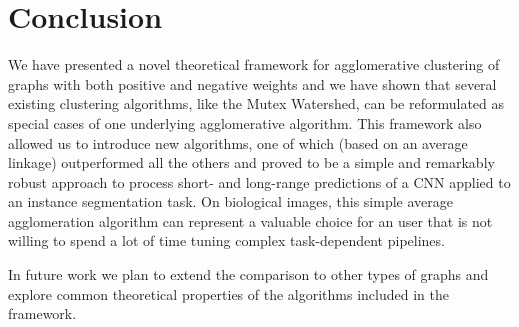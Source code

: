 \section{Conclusion}
We have presented a novel theoretical framework for agglomerative clustering of graphs with both positive and negative weights and we have shown that several existing clustering algorithms, like the Mutex Watershed, can be reformulated as special cases of one underlying agglomerative algorithm. This framework also allowed us to introduce new algorithms, one of which (based on an average linkage) outperformed all the others and proved to be a simple and remarkably robust approach to process short- and long-range predictions of a CNN applied to an instance segmentation task.
On biological images, this simple average agglomeration algorithm can represent a valuable choice for an user that is not willing to spend a lot of time tuning complex task-dependent pipelines. %

In future work we plan to extend the comparison to other types of graphs and explore common theoretical properties of the algorithms included in the framework.
